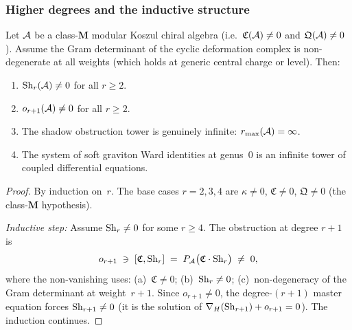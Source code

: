 \subsubsection{Higher degrees and the inductive structure}

\begin{proposition}
\label{prop:thqg-VI-inductive-nontermination}
Let $\mathcal{A}$ be a class-$\mathbf{M}$ modular Koszul chiral algebra
(i.e.\ $\mathfrak{C}(\mathcal{A}) \neq 0$ and $\mathfrak{Q}(\mathcal{A}) \neq 0$).
Assume the Gram determinant of the cyclic deformation complex is
non-degenerate at all weights (which holds at generic central
charge or level). Then:
\begin{enumerate}[label=\textup{(\roman*)}]
\item $\operatorname{Sh}_r(\mathcal{A}) \neq 0$ for all $r \geq 2$.
\item $o_{r+1}(\mathcal{A}) \neq 0$ for all $r \geq 2$.
\item The shadow obstruction tower is genuinely infinite:
 $r_{\max}(\mathcal{A}) = \infty$.
\item The system of soft graviton Ward identities at genus~$0$
 is an infinite tower of coupled differential equations.
\end{enumerate}
\end{proposition}

\begin{proof}
By induction on~$r$. The base cases $r = 2, 3, 4$ are
$\kappa \neq 0$, $\mathfrak{C} \neq 0$, $\mathfrak{Q} \neq 0$
(the class-$\mathbf{M}$ hypothesis).

\emph{Inductive step:} Assume $\operatorname{Sh}_r \neq 0$ for some $r \geq 4$.
The obstruction at degree $r+1$ is
\[
o_{r+1}
\;\ni\;
[\mathfrak{C}, \operatorname{Sh}_r]
\;=\;
P_{\mathcal{A}}\bigl(\mathfrak{C} \cdot \operatorname{Sh}_r\bigr)
\;\neq\; 0,
\]
where the non-vanishing uses: (a)~$\mathfrak{C} \neq 0$;
(b)~$\operatorname{Sh}_r \neq 0$; (c)~non-degeneracy of the Gram determinant
at weight~$r+1$.
Since $o_{r+1} \neq 0$, the degree-$(r+1)$ master equation
forces $\operatorname{Sh}_{r+1} \neq 0$ (it is the solution of
$\nabla_H(\operatorname{Sh}_{r+1}) + o_{r+1} = 0$). The induction continues.
\end{proof}

